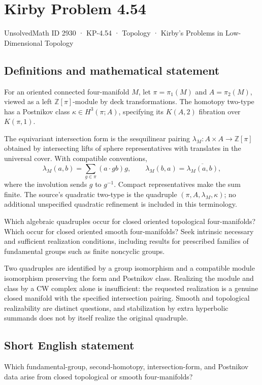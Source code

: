 \documentclass[11pt,a4paper]{article}
\begin{document}
\section*{Kirby Problem 4.54}\label{2930}
{\small UnsolvedMath ID 2930 · KP-4.54 · Topology · Kirby's Problems in Low-Dimensional Topology}
\subsection{Definitions and mathematical statement}
For an oriented connected four-manifold $M$, let $\pi=\pi_1(M)$ and $A=\pi_2(M)$, viewed as a left $\mathbb Z[\pi]$-module by deck transformations. The homotopy two-type has a Postnikov class $\kappa\in H^3(\pi;A)$, specifying its $K(A,2)$ fibration over $K(\pi,1)$.

The equivariant intersection form is the sesquilinear pairing $\lambda_M:A\times A\to\mathbb Z[\pi]$ obtained by intersecting lifts of sphere representatives with translates in the universal cover. With compatible conventions,
\[
\lambda_M(a,b)=\sum_{g\in\pi}(a\cdot gb)g,
\qquad \lambda_M(b,a)=\overline{\lambda_M(a,b)},
\]
where the involution sends $g$ to $g^{-1}$. Compact representatives make the sum finite. The source's quadratic two-type is the quadruple $(\pi,A,\lambda_M,\kappa)$; no additional unspecified quadratic refinement is included in this terminology.

Which algebraic quadruples occur for closed oriented topological four-manifolds? Which occur for closed oriented smooth four-manifolds? Seek intrinsic necessary and sufficient realization conditions, including results for prescribed families of fundamental groups such as finite noncyclic groups.

Two quadruples are identified by a group isomorphism and a compatible module isomorphism preserving the form and Postnikov class. Realizing the module and class by a CW complex alone is insufficient: the requested realization is a genuine closed manifold with the specified intersection pairing. Smooth and topological realizability are distinct questions, and stabilization by extra hyperbolic summands does not by itself realize the original quadruple.
\subsection{Short English statement}
Which fundamental-group, second-homotopy, intersection-form, and Postnikov data arise from closed topological or smooth four-manifolds?
\end{document}
